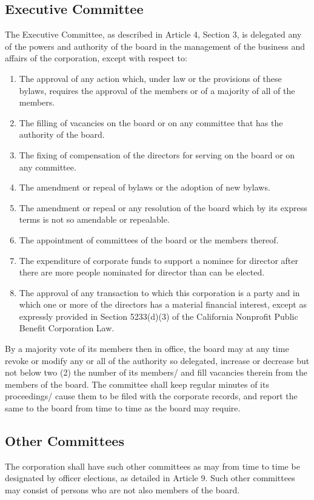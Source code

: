 \documentclass{article}
\begin{document}
	\subsection{Executive Committee}
	The Executive Committee, as described in Article 4, Section 3, is delegated any of the powers and authority of the board in the management of the business and affairs of the corporation, except with respect to:
	\begin{enumerate}[\indent (a)]
		\item The approval of any action which, under law or the provisions of these bylaws, requires the approval of the members or of a majority of all of the members.
		\item The filling of vacancies on the board or on any committee that has the authority of the board. 
		\item The fixing of compensation of the directors for serving on the board or on any committee.
		\item The amendment or repeal of bylaws or the adoption of new bylaws.
		\item The amendment or repeal or any resolution of the board which by its express terms is not so amendable or repealable.
		\item The appointment of committees of the board or the members thereof.
		\item The expenditure of corporate funds to support a nominee for director after there are more people nominated for director than can be elected.
		\item The approval of any transaction to which this corporation is a party and in which one or more of the directors has a material financial interest, except as expressly provided in Section 5233(d)(3) of the California Nonprofit Public Benefit Corporation Law.
	\end{enumerate}
	By a majority vote of its members then in office, the board may at any time revoke or modify any or all of the authority so delegated, increase or decrease but not below two (2) the number of its members/ and fill vacancies therein from the members of the board.
	The committee shall keep regular minutes of its proceedings/ cause them to be filed with the corporate records, and report the same to the board from time to time as the board may require.
	
	\subsection{Other Committees}
	The corporation shall have such other committees as may from time to time be designated by officer elections, as detailed in Article 9. Such other committees may consist of persons who are not also members of the board. 
\end{document}
